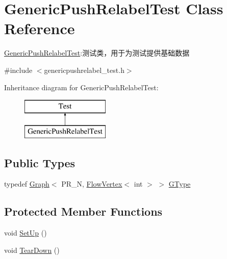 \hypertarget{class_generic_push_relabel_test}{}\section{Generic\+Push\+Relabel\+Test Class Reference}
\label{class_generic_push_relabel_test}


\hyperlink{class_generic_push_relabel_test}{Generic\+Push\+Relabel\+Test}\+:测试类，用于为测试提供基础数据  




{\ttfamily \#include $<$genericpushrelabel\+\_\+test.\+h$>$}

Inheritance diagram for Generic\+Push\+Relabel\+Test\+:\begin{figure}[H]
\begin{center}
\leavevmode
\includegraphics[height=2.000000cm]{class_generic_push_relabel_test}
\end{center}
\end{figure}
\subsection*{Public Types}
\begin{DoxyCompactItemize}
\item 
typedef \hyperlink{struct_introduction_to_algorithm_1_1_graph_algorithm_1_1_graph}{Graph}$<$ P\+R\+\_\+\+N, \hyperlink{struct_introduction_to_algorithm_1_1_graph_algorithm_1_1_flow_vertex}{Flow\+Vertex}$<$ int $>$ $>$ \hyperlink{class_generic_push_relabel_test_af6684144e5419944b2fe025117401bbc}{G\+Type}
\end{DoxyCompactItemize}
\subsection*{Protected Member Functions}
\begin{DoxyCompactItemize}
\item 
void \hyperlink{class_generic_push_relabel_test_ad6fe14069d4f8edf4718c55f23b2e0d8}{Set\+Up} ()
\item 
void \hyperlink{class_generic_push_relabel_test_a90c573a2500d5dda0243d429a606aa6b}{Tear\+Down} ()
\end{DoxyCompactItemize}
